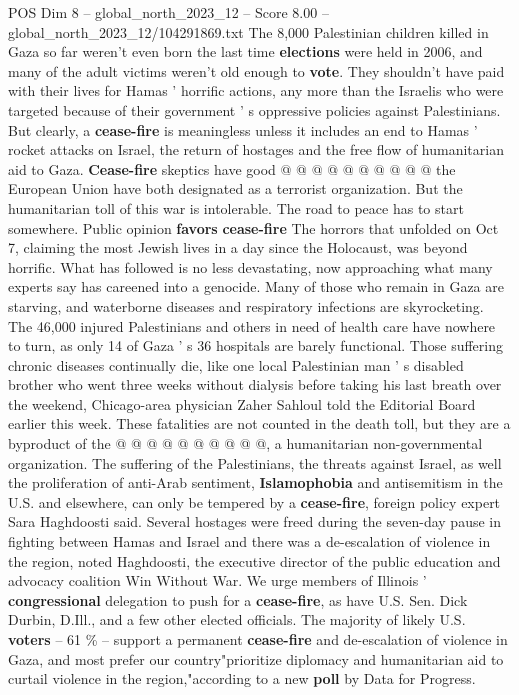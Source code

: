 \begin{textsample}{POS Dim 8 – global\_north\_2023\_12 – Score 8.00 – global\_north\_2023\_12/104291869.txt}
The 8,000 Palestinian children killed in Gaza so far weren't even born the last time \textbf{elections} were held in 2006, and many of the adult victims weren't old enough to \textbf{vote}.
They shouldn't have paid with their lives for Hamas ' horrific actions, any more than the Israelis who were targeted because of their government ' s oppressive policies against Palestinians.
But clearly, a \textbf{cease-fire} is meaningless unless it includes an end to Hamas ' rocket attacks on Israel, the return of hostages and the free flow of humanitarian aid to Gaza. \textbf{Cease-fire} skeptics have good @ @ @ @ @ @ @ @ @ @ the European Union have both designated as a terrorist organization.
But the humanitarian toll of this war is intolerable.
The road to peace has to start somewhere.
Public opinion \textbf{favors} \textbf{cease-fire} The horrors that unfolded on Oct 7, claiming the most Jewish lives in a day since the Holocaust, was beyond horrific.
What has followed is no less devastating, now approaching what many experts say has careened into a genocide.
Many of those who remain in Gaza are starving, and waterborne diseases and respiratory infections are skyrocketing.
The 46,000 injured Palestinians and others in need of health care have nowhere to turn, as only 14 of Gaza ' s 36 hospitals are barely functional.
Those suffering chronic diseases continually die, like one local Palestinian man ' s disabled brother who went three weeks without dialysis before taking his last breath over the weekend, Chicago-area physician Zaher Sahloul told the Editorial Board earlier this week.
These fatalities are not counted in the death toll, but they are a byproduct of the @ @ @ @ @ @ @ @ @ @, a humanitarian non-governmental organization.
The suffering of the Palestinians, the threats against Israel, as well the proliferation of anti-Arab sentiment, \textbf{Islamophobia} and antisemitism in the U.S. and elsewhere, can only be tempered by a \textbf{cease-fire}, foreign policy expert Sara Haghdoosti said.
Several hostages were freed during the seven-day pause in fighting between Hamas and Israel and there was a de-escalation of violence in the region, noted Haghdoosti, the executive director of the public education and advocacy coalition Win Without War.
We urge members of Illinois ' \textbf{congressional} delegation to push for a \textbf{cease-fire}, as have U.S.
Sen.
Dick Durbin, D.Ill., and a few other elected officials.
The majority of likely U.S. \textbf{voters} -- 61 \% -- support a permanent \textbf{cease-fire} and de-escalation of violence in Gaza, and most prefer our country"prioritize diplomacy and humanitarian aid to curtail violence in the region,"according to a new \textbf{poll} by Data for Progress.

\end{textsample}
